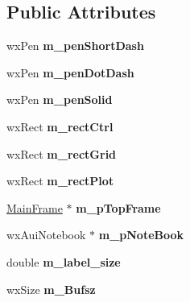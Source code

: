 \subsection*{Public Attributes}
\begin{DoxyCompactItemize}
\item 
\hypertarget{class_plot_panel_a111adb0975870b5d448da832bd44fc99}{wx\-Pen {\bfseries m\-\_\-pen\-Short\-Dash}}\label{class_plot_panel_a111adb0975870b5d448da832bd44fc99}

\item 
\hypertarget{class_plot_panel_a227751dba1777b261ffdc27b53fb087d}{wx\-Pen {\bfseries m\-\_\-pen\-Dot\-Dash}}\label{class_plot_panel_a227751dba1777b261ffdc27b53fb087d}

\item 
\hypertarget{class_plot_panel_a229628c08bb7d0fa16589dbf83d635d1}{wx\-Pen {\bfseries m\-\_\-pen\-Solid}}\label{class_plot_panel_a229628c08bb7d0fa16589dbf83d635d1}

\item 
\hypertarget{class_plot_panel_ad1cfa169df1cfa5ef798b57d2619d742}{wx\-Rect {\bfseries m\-\_\-rect\-Ctrl}}\label{class_plot_panel_ad1cfa169df1cfa5ef798b57d2619d742}

\item 
\hypertarget{class_plot_panel_a467e202bbd0fa3ef1997fa2b322e349d}{wx\-Rect {\bfseries m\-\_\-rect\-Grid}}\label{class_plot_panel_a467e202bbd0fa3ef1997fa2b322e349d}

\item 
\hypertarget{class_plot_panel_afcee74e089f5a50659bb534db80532d9}{wx\-Rect {\bfseries m\-\_\-rect\-Plot}}\label{class_plot_panel_afcee74e089f5a50659bb534db80532d9}

\item 
\hypertarget{class_plot_panel_ad28637582a93843082fc7b1d8d80c807}{\hyperlink{class_main_frame}{Main\-Frame} $\ast$ {\bfseries m\-\_\-p\-Top\-Frame}}\label{class_plot_panel_ad28637582a93843082fc7b1d8d80c807}

\item 
\hypertarget{class_plot_panel_a63b99d2f75a6486dda96f4934ba369fa}{wx\-Aui\-Notebook $\ast$ {\bfseries m\-\_\-p\-Note\-Book}}\label{class_plot_panel_a63b99d2f75a6486dda96f4934ba369fa}

\item 
\hypertarget{class_plot_panel_a00eb5aef94866f0f385fcf793cb841b6}{double {\bfseries m\-\_\-label\-\_\-size}}\label{class_plot_panel_a00eb5aef94866f0f385fcf793cb841b6}

\item 
\hypertarget{class_plot_panel_a61a49a35721e334b959e833464add15f}{wx\-Size {\bfseries m\-\_\-\-Bufsz}}\label{class_plot_panel_a61a49a35721e334b959e833464add15f}


\end{DoxyCompactItemize}
